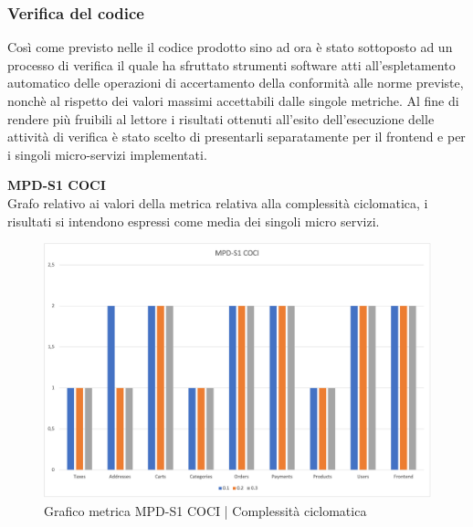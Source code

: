\newpage
\subsubsection{Verifica del codice}
Così come previsto nelle  il codice prodotto sino ad ora è stato sottoposto ad un processo di verifica il quale 
ha sfruttato strumenti software atti all'espletamento automatico delle operazioni di accertamento della conformità alle norme previste, nonchè
al rispetto dei valori massimi accettabili dalle singole metriche.
Al fine di rendere più fruibili al lettore i risultati ottenuti all'esito dell'esecuzione delle attività di verifica è stato scelto di presentarli
separatamente per il frontend e per i singoli micro-servizi implementati.


\begin{center}
    \textbf{MPD-S1 COCI} \\
    Grafo relativo ai valori della metrica relativa alla complessità ciclomatica, i risultati si intendono espressi come media dei singoli
    micro servizi.
    \begin{figure}[!htb]
        \centering
        \includegraphics[scale=0.50]{res/images/RQcoci.png}
        \caption{Grafico metrica MPD-S1 COCI | Complessità ciclomatica}
    \end{figure}
    \begin{center}
        
    \end{center}


\end{center}
